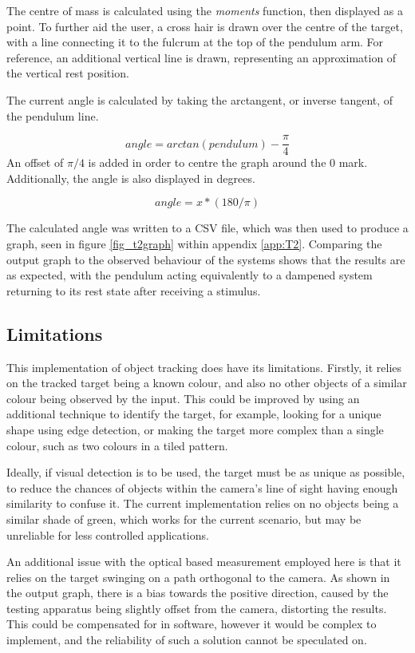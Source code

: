 \documentclass[conference]{IEEEtran}
\begin{document}
The centre of mass is calculated using the \textit{moments} function, then displayed as a point. To further aid the user, a cross hair is drawn over the centre of the target, with a line connecting it to the fulcrum at the top of the pendulum arm. For reference, an additional vertical line is drawn, representing an approximation of the vertical rest position.

The current angle is calculated by taking the arctangent, or inverse tangent, of the pendulum line.

\begin{equation}
angle = arctan(pendulum) - \frac{\pi}{4}
\end{equation}
An offset of $\pi /4$ is added in order to centre the graph around the 0 mark. Additionally, the angle is also displayed in degrees.

\begin{equation}
angle = x*(180/\pi )
\end{equation}

The calculated angle was written to a CSV file, which was then used to produce a graph, seen in figure \ref{fig_t2graph} within appendix \ref{app:T2}. Comparing the output graph to the observed behaviour of the systems shows that the results are as expected, with the pendulum acting equivalently to a dampened system returning to its rest state after receiving a stimulus.

\subsection{Limitations}\label{sec:t2_lim}
This implementation of object tracking does have its limitations. Firstly, it relies on the tracked target being a known colour, and also no other objects of a similar colour being observed by the input. This could be improved by using an additional technique to identify the target, for example, looking for a unique shape using edge detection, or making the target more complex than a single colour, such as two colours in a tiled pattern.

Ideally, if visual detection is to be used, the target must be as unique as possible, to reduce the chances of objects within the camera's line of sight having enough similarity to confuse it. The current implementation relies on no objects being a similar shade of green, which works for the current scenario, but may be unreliable for less controlled applications. 

An additional issue with the optical based measurement employed here is that it relies on the target swinging on a path orthogonal to the camera. As shown in the output graph, there is a bias towards the positive direction, caused by the testing apparatus being slightly offset from the camera, distorting the results. This could be compensated for in software, however  it would be complex to implement, and the reliability of such a solution cannot be speculated on.
\end{document}

